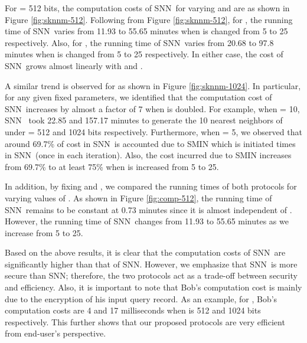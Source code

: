 \documentclass{article}
\newcommand{\sknnb}{SNN}
\newcommand{\sknnm}{SNN}
\begin{document}
For  = 512 bits, the computation costs of \sknnm~for varying  and  are 
as shown in Figure \ref{fig:sknnm-512}. Following from Figure \ref{fig:sknnm-512}, 
for , the running time of \sknnm~varies from 11.93 to 55.65 minutes when  is changed from 5 
to 25 respectively. Also, for , the running time 
of \sknnm~varies from 20.68 to 97.8 minutes when  is changed from 
5 to 25 respectively. In either case, the cost of \sknnm~grows 
almost linearly with  and . 

A similar trend is observed for  as shown in Figure \ref{fig:sknnm-1024}. In 
particular, for any given fixed parameters, we identified 
that the computation cost of \sknnm~increases by almost a factor 
of 7 when  is doubled. For example, when  = 10, \sknnm~ took 22.85 and  
157.17 minutes to generate the 10 nearest neighbors of  
under  = 512 and 1024 bits respectively. Furthermore, 
when  = 5, we observed that around 69.7\% of cost in \sknnm~is accounted due to SMIN which is 
initiated  times in \sknnm~(once in each iteration). Also, the cost incurred 
due to SMIN increases from 69.7\% to at least 75\% when  is increased from 
5 to 25.

In addition, by fixing  and , we compared the 
running times of both protocols for varying values of . As shown in Figure \ref{fig:comp-512}, 
the running time of \sknnb~remains to be constant at 0.73 minutes since it 
is almost independent of . However, 
the running time of \sknnm~changes from 11.93 to 55.65 minutes as we increase  from 5 to 25. 

Based on the above results, it is clear that the computation costs 
of \sknnm~are significantly higher than that of \sknnb. However, we emphasize that \sknnm~is 
more secure than \sknnb; therefore, the two protocols act as a trade-off between security 
and efficiency. Also, it is important to note that Bob's computation cost is mainly due to the 
encryption of his input query record. As an example, for , Bob's computation costs are 4 and 17 milliseconds 
when  is 512 and 1024 bits respectively. This further shows that our proposed protocols are very efficient from 
end-user's perspective.
\end{document}

